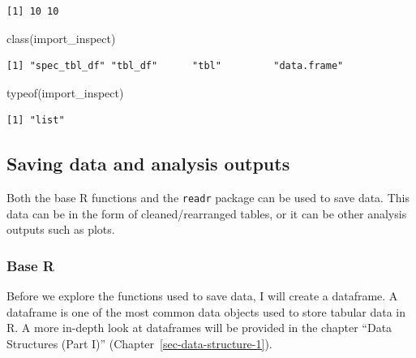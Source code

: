 \documentclass[
  letterpaper,
  DIV=11,
  numbers=noendperiod]{scrreprt}
\newenvironment{Shaded}{\begin{snugshade}}{\end{snugshade}}
\newcommand{\FunctionTok}[1]{\textcolor[rgb]{0.28,0.35,0.67}{#1}}
\newcommand{\NormalTok}[1]{\textcolor[rgb]{0.00,0.23,0.31}{#1}}
\begin{document}
\begin{verbatim}
[1] 10 10
\end{verbatim}

\begin{Shaded}
\begin{Highlighting}[]
\FunctionTok{class}\NormalTok{(import\_inspect)}
\end{Highlighting}
\end{Shaded}

\begin{verbatim}
[1] "spec_tbl_df" "tbl_df"      "tbl"         "data.frame" 
\end{verbatim}

\begin{Shaded}
\begin{Highlighting}[]
\FunctionTok{typeof}\NormalTok{(import\_inspect)}
\end{Highlighting}
\end{Shaded}

\begin{verbatim}
[1] "list"
\end{verbatim}

\subsection{Saving data and analysis
outputs}\label{saving-data-and-analysis-outputs}

Both the base R functions and the \texttt{readr} package can be used to
save data. This data can be in the form of cleaned/rearranged tables, or
it can be other analysis outputs such as plots.

\subsubsection{Base R}\label{base-r-1}

Before we explore the functions used to save data, I will create a
dataframe. A dataframe is one of the most common data objects used to
store tabular data in R. A more in-depth look at dataframes will be
provided in the chapter ``Data Structures (Part I)''
(Chapter~\ref{sec-data-structure-1}).
\end{document}
